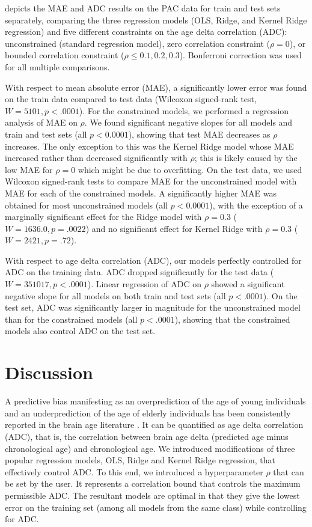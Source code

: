 \documentclass[utf8]{frontiersSCNS} %
\begin{document}
 depicts the MAE and ADC results on the PAC data for train and test sets separately, comparing the three regression models (OLS, Ridge, and Kernel Ridge regression) and five different constraints on the age delta correlation (ADC): unconstrained (standard regression model), zero correlation constraint ($\rho=0$), or bounded correlation constraint ($\rho\le 0.1, 0.2, 0.3$). Bonferroni correction was used for all multiple comparisons.

With respect to mean absolute error (MAE), a significantly lower error was found on the train data compared to test data (Wilcoxon signed-rank test, $W=5101, p<.0001$). For the constrained models, we performed a regression analysis of MAE on $\rho$. We found significant negative slopes for all models and train and test sets (all $p < 0.0001$), showing that test MAE decreases as $\rho$ increases. The only exception to this was the Kernel Ridge model whose MAE increased rather than decreased significantly with $\rho$; this is likely caused by the low MAE for $\rho=0$ which might be due to overfitting. On the test data, we used Wilcoxon signed-rank tests to compare MAE for the unconstrained model with MAE for each of the constrained models. A significantly higher MAE was obtained for most unconstrained models (all $p < 0.0001$), with the exception of a marginally significant effect for the Ridge model with $\rho=0.3$ ($W=1636.0, p=.0022$) and no significant effect for Kernel Ridge with $\rho=0.3$ ($W=2421, p=.72$).

With respect to age delta correlation (ADC), our models perfectly controlled for ADC on the training data. ADC dropped significantly for the test data ($W=351017, p<.0001$). Linear regression of ADC on $\rho$ showed a significant negative slope for all models on both train and test sets (all $p < .0001$). On the test set, ADC was significantly larger in magnitude for the unconstrained model than for the constrained models (all $p < .0001$), showing that the constrained models also control ADC on the test set. 

\section{Discussion}

A predictive bias manifesting as an overprediction of the age of young individuals and an underprediction of the age of elderly individuals has been consistently reported in the brain age literature \citep{Cole2017PredictingBiomarker,Liang2019InvestigatingDisorders,Smith2019EstimationImaging,Le2018ABrainAGE}. It can be quantified as age delta correlation (ADC), that is, the correlation between brain age delta (predicted age minus chronological age) and chronological age. 
We introduced modifications of three popular regression models, OLS, Ridge and Kernel Ridge regression, that effectively control ADC. To this end, we introduced a hyperparameter $\rho$ that can be set by the user. It represents a correlation bound that controls the maximum permissible ADC. The resultant models are optimal in that they give the lowest error on the training set (among all models from the same class) while controlling for ADC. 
\end{document}
